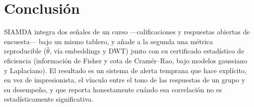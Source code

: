 \documentclass[11pt,a4paper,oneside]{article}
\theoremstyle{definition}
\begin{document}
\section{Conclusión}

SIAMDA integra dos señales de un curso —calificaciones y respuestas abiertas de encuesta— bajo
un mismo tablero, y añade a la segunda una métrica reproducible ($\hat\theta$, vía embeddings y
DWT) junto con su certificado estadístico de eficiencia (información de Fisher y cota de
Cramér--Rao, bajo modelos gaussiano y Laplaciano). El resultado es un sistema de alerta
temprana que hace explícito, en vez de impresionista, el vínculo entre el tono de las
respuestas de un grupo y su desempeño, y que reporta honestamente cuándo esa correlación no es
estadísticamente significativa.
\end{document}

